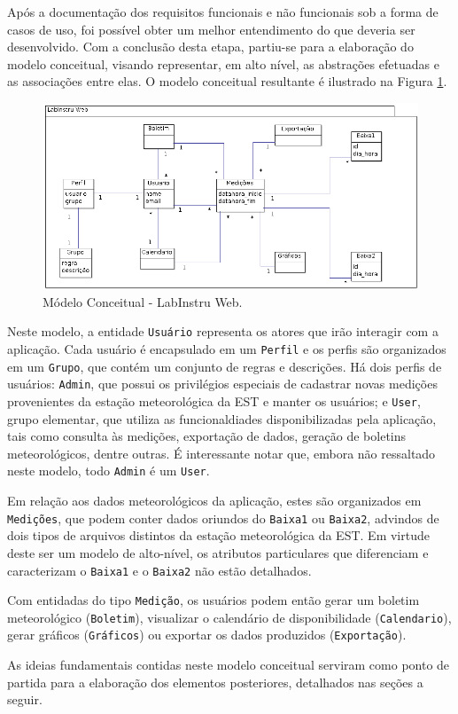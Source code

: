 Após a documentação dos requisitos funcionais e não funcionais sob a forma de casos de uso, foi possível obter um melhor entendimento do que deveria ser desenvolvido. Com a conclusão desta etapa, partiu-se para a elaboração do modelo conceitual, visando representar, em alto nível, as abstrações efetuadas e as associações entre elas. O modelo conceitual resultante é ilustrado na Figura \ref{fig:modeloConceitual}.

\begin{figure}[H]
	\centering
	\includegraphics[scale=0.8]{img/ModeloConceitual.png}
	\caption{Módelo Conceitual - LabInstru Web.}
	\label{fig:modeloConceitual}
\end{figure}

Neste modelo, a entidade \texttt{Usuário} representa os atores que irão interagir com a aplicação. Cada usuário é encapsulado em um \texttt{Perfil} e os perfis são organizados em um \texttt{Grupo}, que contém um conjunto de regras e descrições. Há dois perfis de usuários: \texttt{Admin}, que possui os privilégios especiais de cadastrar novas medições provenientes da estação meteorológica da EST e manter os usuários; e \texttt{User}, grupo elementar, que utiliza as funcionaldiades disponibilizadas pela aplicação, tais como consulta às medições, exportação de dados, geração de boletins meteorológicos, dentre outras. É interessante notar que, embora não ressaltado neste modelo, todo \texttt{Admin} é um \texttt{User}.

Em relação aos dados meteorológicos da aplicação, estes são organizados em \texttt{Medições}, que podem conter dados oriundos do \texttt{Baixa1} ou \texttt{Baixa2}, advindos de dois tipos de arquivos distintos da estação meteorológica da EST. Em virtude deste ser um modelo de alto-nível, os atributos particulares que diferenciam e caracterizam o \texttt{Baixa1} e o \texttt{Baixa2} não estão detalhados.

Com entidadas do tipo \texttt{Medição}, os usuários podem então gerar um boletim meteorológico (\texttt{Boletim}), visualizar o calendário de disponibilidade (\texttt{Calendario}), gerar gráficos (\texttt{Gráficos}) ou exportar os dados produzidos (\texttt{Exportação}).

As ideias fundamentais contidas neste modelo conceitual serviram como ponto de partida para a elaboração dos elementos posteriores, detalhados nas seções a seguir.
